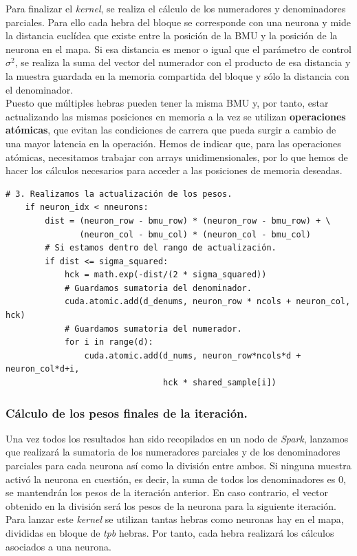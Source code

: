 Para finalizar el \textit{kernel}, se realiza el cálculo de los numeradores y denominadores parciales. Para ello cada hebra del bloque se corresponde con una neurona y mide la distancia euclídea que existe entre la posición de la BMU y la posición de la neurona en el mapa. Si esa distancia es menor o igual que el parámetro de control $\sigma^2$, se realiza la suma del vector del numerador con el producto de esa distancia y la muestra guardada en la memoria compartida del bloque y sólo la distancia con el denominador. \\

Puesto que múltiples hebras pueden tener la misma BMU y, por tanto, estar actualizando las mismas posiciones en memoria a la vez se utilizan \textbf{operaciones atómicas}, que evitan las condiciones de carrera que pueda surgir a cambio de una mayor latencia en la operación. Hemos de indicar que, para las operaciones atómicas, necesitamos trabajar con arrays unidimensionales, por lo que hemos de hacer los cálculos necesarios para acceder a las posiciones de memoria deseadas.\\
\begin{code}
\begin{verbatim}
# 3. Realizamos la actualización de los pesos.
    if neuron_idx < nneurons:
        dist = (neuron_row - bmu_row) * (neuron_row - bmu_row) + \
               (neuron_col - bmu_col) * (neuron_col - bmu_col)
        # Si estamos dentro del rango de actualización.
        if dist <= sigma_squared:
            hck = math.exp(-dist/(2 * sigma_squared))
            # Guardamos sumatoria del denominador.
            cuda.atomic.add(d_denums, neuron_row * ncols + neuron_col, hck)
            # Guardamos sumatoria del numerador.
            for i in range(d):
                cuda.atomic.add(d_nums, neuron_row*ncols*d + neuron_col*d+i,
                                hck * shared_sample[i])
\end{verbatim}
\label{code:somiter3}
\end{code}


\subsubsection{Cálculo de los pesos finales de la iteración.}
Una vez todos los resultados han sido recopilados en un nodo de \textit{Spark}, lanzamos que realizará la sumatoria de los numeradores parciales y de los denominadores parciales para cada neurona así como la división entre ambos. Si ninguna muestra activó la neurona en cuestión, es decir, la suma de todos los denominadores es 0, se mantendrán los pesos de la iteración anterior. En caso contrario, el vector obtenido en la división será los pesos de la neurona para la siguiente iteración. Para lanzar este \textit{kernel} se utilizan tantas hebras como neuronas hay en el mapa, divididas en bloque de \textit{tpb} hebras. Por tanto, cada hebra realizará los cálculos asociados a una neurona. \\

